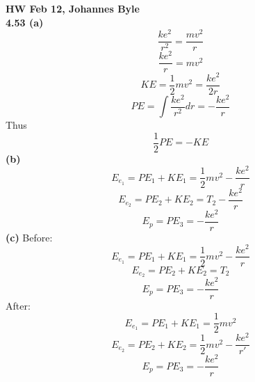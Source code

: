 \documentclass[english]{article}
\begin{document}
\textbf{HW Feb 12, Johannes Byle}\\

\noindent
\textbf{4.53 (a)} $$\frac{ke^2}{r^2}=\frac{mv^2}{r}$$
$$\frac{ke^2}{r}=mv^2$$
$$KE=\frac{1}{2}mv^2=\frac{ke^2}{2r}$$
$$PE=\int \frac{ke^2}{r^2}dr=-\frac{ke^2}{r}$$
Thus
$$\frac{1}{2}PE=-KE$$
\textbf{(b)} $$E_{e_1}=PE_1+KE_1=\frac{1}{2}mv^2-\frac{ke^2}{r}$$
$$E_{e_2}=PE_2+KE_2=T_2-\frac{ke^2}{r}$$
$$E_p=PE_3=-\frac{ke^2}{r}$$
\textbf{(c)} Before:\\ 
$$E_{e_1}=PE_1+KE_1=\frac{1}{2}mv^2-\frac{ke^2}{r}$$
$$E_{e_2}=PE_2+KE_2=T_2$$
$$E_p=PE_3=-\frac{ke^2}{r}$$
After:\\
$$E_{e_1}=PE_1+KE_1=\frac{1}{2}mv^2$$
$$E_{e_2}=PE_2+KE_2=\frac{1}{2}mv^2-\frac{ke^2}{r'}$$
$$E_p=PE_3=-\frac{ke^2}{r}$$
\end{document}
